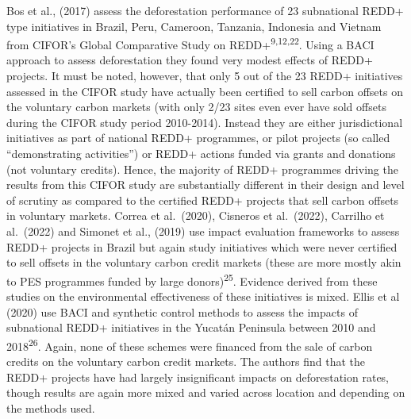 \documentclass[
]{article}
\begin{document}
Bos et al., (2017) assess the deforestation performance of 23
subnational REDD+ type initiatives in Brazil, Peru, Cameroon, Tanzania,
Indonesia and Vietnam from CIFOR's Global Comparative Study on
REDD+\textsuperscript{9,12,22}. Using a BACI approach to assess
deforestation they found very modest effects of REDD+ projects. It must
be noted, however, that only 5 out of the 23 REDD+ initiatives assessed
in the CIFOR study have actually been certified to sell carbon offsets
on the voluntary carbon markets (with only 2/23 sites even ever have
sold offsets during the CIFOR study period 2010-2014). Instead they are
either jurisdictional initiatives as part of national REDD+ programmes,
or pilot projects (so called ``demonstrating activities'') or REDD+
actions funded via grants and donations (not voluntary credits). Hence,
the majority of REDD+ programmes driving the results from this CIFOR
study are substantially different in their design and level of scrutiny
as compared to the certified REDD+ projects that sell carbon offsets in
voluntary markets. Correa et al.~(2020), Cisneros et al.~(2022),
Carrilho et al.~(2022) and Simonet et al., (2019) use impact evaluation
frameworks to assess REDD+ projects in Brazil but again study
initiatives which were never certified to sell offsets in the voluntary
carbon credit markets (these are more mostly akin to PES programmes
funded by large donors)\textsuperscript{25}. Evidence derived from these
studies on the environmental effectiveness of these initiatives is
mixed. Ellis et al (2020) use BACI and synthetic control methods to
assess the impacts of subnational REDD+ initiatives in the Yucatán
Peninsula between 2010 and 2018\textsuperscript{26}. Again, none of
these schemes were financed from the sale of carbon credits on the
voluntary carbon credit markets. The authors find that the REDD+
projects have had largely insignificant impacts on deforestation rates,
though results are again more mixed and varied across location and
depending on the methods used.
\end{document}
